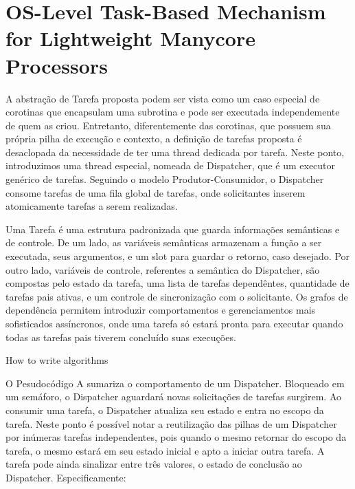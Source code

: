 \section{OS-Level Task-Based Mechanism for Lightweight Manycore Processors}
\label{sec:solution}

	A abstração de Tarefa proposta podem ser vista como um caso especial de
	corotinas que encapsulam uma subrotina e pode ser executada independemente
	de quem as criou. Entretanto, diferentemente das corotinas, que possuem sua
	própria pilha de execução e contexto, a definição de tarefas proposta
	é desaclopada da necessidade de ter uma thread dedicada por tarefa. Neste
	ponto, introduzimos uma thread especial, nomeada de Dispatcher, que é um
	executor genérico de tarefas.  Seguindo o modelo Produtor-Consumidor,
	o Dispatcher consome tarefas de uma fila global de tarefas, onde
	solicitantes inserem atomicamente tarefas a serem realizadas.

	Uma Tarefa é uma estrutura padronizada que guarda informações semânticas
	e de controle. De um lado, as variáveis semânticas armazenam a função a ser
	executada, seus argumentos, e um slot para guardar o retorno, caso
	desejado. Por outro lado, variáveis de controle, referentes a semântica do
	Dispatcher, são compostas pelo estado da tarefa, uma lista de tarefas
	dependêntes, quantidade de tarefas pais ativas, e um controle de
	sincronização com o solicitante.  Os grafos de dependência permitem
	introduzir comportamentos e gerenciamentos mais sofisticados assíncronos,
	onde uma tarefa só estará pronta para executar quando todas as tarefas pais
	tiverem concluído suas execuções.

	\begin{algorithm}[b]
		\caption{How to write algorithms}
	\end{algorithm}

	O Pesudocódigo A sumariza o comportamento de um Dispatcher. Bloqueado em um
	semáforo, o Dispatcher aguardará novas solicitações de tarefas surgirem.
	Ao consumir uma tarefa, o Dispatcher atualiza seu estado e entra no escopo
	da tarefa. Neste ponto é possível notar a reutilização das pilhas de um
	Dispatcher por inúmeras tarefas independentes, pois quando o mesmo retornar
	do escopo da tarefa, o mesmo estará em seu estado inicial e apto a iniciar
	outra tarefa.  A tarefa pode ainda sinalizar entre três valores, o estado
	de conclusão ao Dispatcher. Especificamente:

